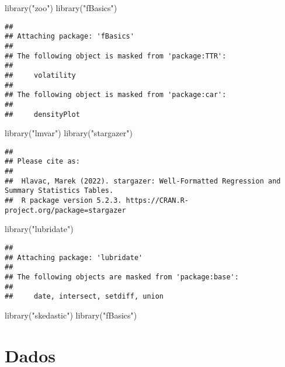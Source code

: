 \documentclass[
]{article}
\newenvironment{Shaded}{\begin{snugshade}}{\end{snugshade}}
\newcommand{\FunctionTok}[1]{\textcolor[rgb]{0.00,0.00,0.00}{#1}}
\newcommand{\NormalTok}[1]{#1}
\newcommand{\StringTok}[1]{\textcolor[rgb]{0.31,0.60,0.02}{#1}}
\begin{document}
\begin{Shaded}
\begin{Highlighting}[]
\FunctionTok{library}\NormalTok{(}\StringTok{"zoo"}\NormalTok{)}
\FunctionTok{library}\NormalTok{(}\StringTok{"fBasics"}\NormalTok{)}
\end{Highlighting}
\end{Shaded}

\begin{verbatim}
## 
## Attaching package: 'fBasics'
## 
## The following object is masked from 'package:TTR':
## 
##     volatility
## 
## The following object is masked from 'package:car':
## 
##     densityPlot
\end{verbatim}

\begin{Shaded}
\begin{Highlighting}[]
\FunctionTok{library}\NormalTok{(}\StringTok{"lmvar"}\NormalTok{)}
\FunctionTok{library}\NormalTok{(}\StringTok{"stargazer"}\NormalTok{)}
\end{Highlighting}
\end{Shaded}

\begin{verbatim}
## 
## Please cite as: 
## 
##  Hlavac, Marek (2022). stargazer: Well-Formatted Regression and Summary Statistics Tables.
##  R package version 5.2.3. https://CRAN.R-project.org/package=stargazer
\end{verbatim}

\begin{Shaded}
\begin{Highlighting}[]
\FunctionTok{library}\NormalTok{(}\StringTok{"lubridate"}\NormalTok{)}
\end{Highlighting}
\end{Shaded}

\begin{verbatim}
## 
## Attaching package: 'lubridate'
## 
## The following objects are masked from 'package:base':
## 
##     date, intersect, setdiff, union
\end{verbatim}

\begin{Shaded}
\begin{Highlighting}[]
\FunctionTok{library}\NormalTok{(}\StringTok{"skedastic"}\NormalTok{)}
\FunctionTok{library}\NormalTok{(}\StringTok{"fBasics"}\NormalTok{)}
\end{Highlighting}
\end{Shaded}

\hypertarget{dados}{%
\section{Dados}\label{dados}}
\end{document}
